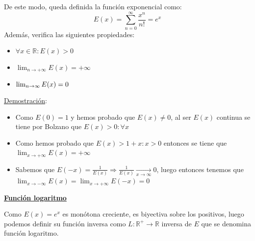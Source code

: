 \documentclass[10pt,a4paper,openright]{book}
\theoremstyle{break}
\begin{document}
De este modo, queda definida la función exponencial como:
$$E(x) = \sum_{n=0}^{\infty} \frac{x^n}{n!} = e^x$$
Además, verifica las siguientes propiedades:
\begin{itemize}
\item $\forall x \in \mathbb R: E(x) > 0$
\item $\lim_{n \to +\infty} E(x) = + \infty$
\item $\lim_{n \to \-\infty} E(x) = 0$
\end{itemize}
\underline{Demostración}:
\begin{itemize}
\item Como $E(0) = 1$ y hemos probado que $E(x) \neq 0$, al ser $E(x)$ continua se tiene por Bolzano que $E(x) > 0 : \forall x $
\item Como hemos probado que $E(x) > 1 + x : x > 0$ entonces se tiene que $\lim_{x \to +\infty} E(x) = + \infty$

\item Sabemos que $ E(-x) = \frac{1}{E(x)} \Rightarrow \frac{1}{E(x)} \underset{x \to \infty}{\longrightarrow} 0$, luego entonces tenemos que $\lim_{x \to -\infty} E(x) = \lim_{x \to +\infty} E(-x) = 0$
\end{itemize}

\underline{\textbf{Función logaritmo}}

Como $E(x) = e^x$ es monótona creciente, es biyectiva sobre los positivos, luego podemos definir su función inversa como $L: \mathbb{R}^+ \to \mathbb{R}$ inversa de $E$ que se denomina función logaritmo.
\end{document}

